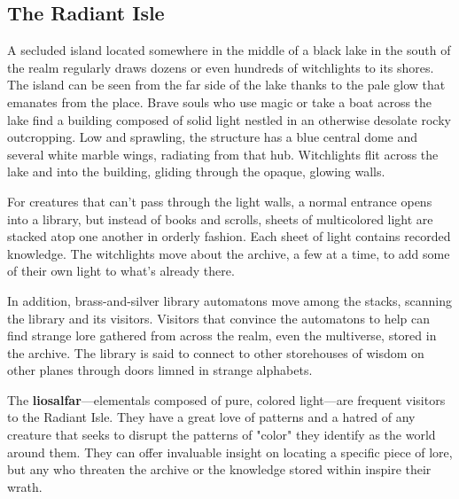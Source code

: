 \documentclass[10pt,a4paper,twoside,bg=print,twocolumn,openany,nodeprecatedcode]{dndbook}
\begin{document}
\subsection{The Radiant Isle}
A secluded island located somewhere in the middle of a black lake in the south of the realm regularly draws dozens or even hundreds of witchlights to its shores. The island can be seen from the far side of the lake thanks to the pale glow that emanates from the place. Brave souls who use magic or take a boat across the lake find a building composed of solid light nestled in an otherwise desolate rocky outcropping. Low and sprawling, the structure has a blue central dome and several white marble wings, radiating from that hub. Witchlights flit across the lake and into the building, gliding through the opaque, glowing walls.

For creatures that can't pass through the light walls, a normal entrance opens into a library, but instead of books and scrolls, sheets of multicolored light are stacked atop one another in orderly fashion. Each sheet of light contains recorded knowledge. The witchlights move about the archive, a few at a time, to add some of their own light to what's already there.

In addition, brass-and-silver library automatons move among the stacks, scanning the library and its visitors. Visitors that convince the automatons to help can find strange lore gathered from across the realm, even the multiverse, stored in the archive. The library is said to connect to other storehouses of wisdom on other planes through doors limned in strange alphabets.

The \textbf{liosalfar}—elementals composed of pure, colored light—are frequent visitors to the Radiant Isle. They have a great love of patterns and a hatred of any creature that seeks to disrupt the patterns of "color" they identify as the world around them. They can offer invaluable insight on locating a specific piece of lore, but any who threaten the archive or the knowledge stored within inspire their wrath.
\end{document}
